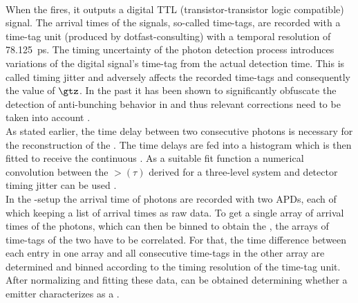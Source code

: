 		\\
		When the \APD fires, it outputs a digital TTL (transistor-transistor logic compatible) signal.
		The arrival times of the signals, so-called time-tags, are recorded with a time-tag unit (produced by dotfast-consulting) with a temporal resolution of \SI{78.125}{\pico\second}.
		The timing uncertainty of the photon detection process introduces variations of the digital signal's time-tag from the actual detection time.
		This is called timing jitter and adversely affects the recorded time-tags and consequently the value of $\gtz$. In the past it has been shown to significantly obfuscate the detection of anti-bunching behavior in \sps and thus relevant corrections need to be taken into account \cite{neu::thesis, janine::thesis}.
		\\
		As stated earlier, the time delay between two consecutive photons is necessary for the reconstruction of the \gtf.
		The time delays are fed into a histogram which is then fitted to receive the continuous \gtf.
		As a suitable fit function a numerical convolution between the $\gt(\tau)$ derived for a three-level system and detector timing jitter can be used \cite{becker::16, neu::thesis, janine::thesis}.
		\\
		In the \HBT{}-setup the arrival time of photons are recorded with two APDs, each of which keeping a list of arrival times as raw data.
		To get a single array of arrival times of the photons, which can then be binned to obtain the \gtf, the arrays of time-tags of the two \APDs have to be correlated.
		For that, the time difference between each entry in one array and all consecutive time-tags in the other array are determined and binned according to the timing resolution of the time-tag unit.
		After normalizing and fitting these data, \gtz can be obtained determining whether a emitter characterizes as a \sps.
